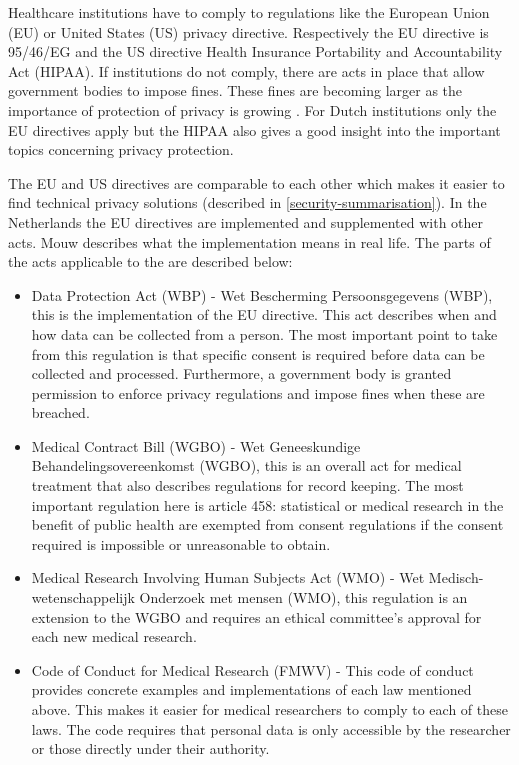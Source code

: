 Healthcare institutions have to comply to regulations like the European Union (EU) or United States (US) privacy directive.
Respectively the EU directive is 95/46/EG and the US directive Health Insurance Portability and Accountability Act (HIPAA).
If institutions do not comply, there are acts in place that allow government bodies to impose fines.
These fines are becoming larger as the importance of protection of privacy is growing \cite{s1Zamosky2014}.
For Dutch institutions only the EU directives apply but the HIPAA also gives a good insight into the important topics concerning privacy protection.

The EU and US directives are comparable to each other which makes it easier to find technical privacy solutions (described in \ref{security-summarisation}).
In the Netherlands the EU directives are implemented and supplemented with other acts.
Mouw \cite{s19Mouw2012} describes what the implementation means in real life. 
The  parts of the acts applicable to the \ivfsystem{} are described below:

\begin{itemize}
	\item Data Protection Act (WBP) - Wet Bescherming Persoonsgegevens (WBP), this is the implementation of the EU directive.
	This act describes when and how data can be collected from a person.
	The most important point to take from this regulation is that specific consent is required before data can be collected and processed.
	Furthermore, a government body is granted permission to enforce privacy regulations and impose fines when these are breached.
	\item Medical Contract Bill (WGBO) - Wet Geneeskundige Behandelingsovereenkomst (WGBO), this is an overall act for medical treatment that also describes regulations for record keeping.
	The most important regulation here is article 458: statistical or medical research in the benefit of public health are exempted from consent regulations if the consent required is impossible or unreasonable to obtain.
	\item Medical Research Involving Human Subjects Act (WMO) - Wet Medisch-wetenschappelijk Onderzoek met mensen (WMO), this regulation is an extension to the WGBO and requires an ethical committee's approval for each new medical research.
	\item Code of Conduct for Medical Research (FMWV) - This code of conduct provides concrete examples and implementations of each law mentioned above.
	This makes it easier for medical researchers to comply to each of these laws.
	The code requires that personal data is only accessible by the researcher or those directly under their authority.
\end{itemize}

